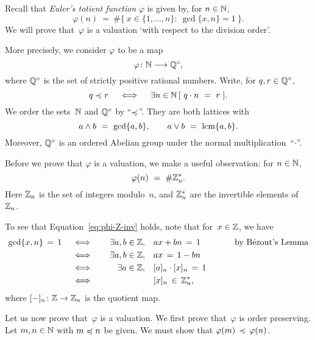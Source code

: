 \documentclass[main.tex]{subfiles}
\begin{document}
\begin{ex}
Recall that \emph{Euler's totient function}
$\varphi$
is given by,
for $n\in \mathbb{N}$,
\begin{equation*}
\varphi(n) \ =\ \#\{ \  x\in \{1,\dotsc,n\}\colon \ \gcd\{x,n\}=1\ \}.
\end{equation*}
We will prove that~$\varphi$
is a valuation `with respect to the division order'.

More precisely,
we consider $\varphi$ to be a map
\begin{equation*}
\varphi\colon \mathbb{N} \longrightarrow  \mathbb{Q}^\circ,
\end{equation*}
where $\mathbb{Q}^\circ$
is the set of strictly positive rational numbers.
Write, for $q,r\in\mathbb{Q}^\circ$,
\begin{equation*}
q\preccurlyeq r \quad\iff\quad \exists n\in\mathbb{N}\, [\ q \cdot n \ =\  r\ ].
\end{equation*}
We order the sets~$\mathbb{N}$ and $\mathbb{Q}^\circ$ by ``$\preccurlyeq$''.
They are both lattices with
\begin{equation*}
a\wedge b \ =\ \gcd\{a,b\},\qquad a \vee b \ =\ \lcm\{a,b\}.
\end{equation*}
Moreover,
$\mathbb{Q}^\circ$
is an ordered Abelian group under the normal multiplication~``$\cdot$''.

Before we prove that $\varphi$ is a valuation,
we make a useful observation: for $n\in\mathbb{N}$,
\begin{equation}
\label{eq:phi-Z-inv}
\varphi(n) \ =\ \# \mathbb{Z}_{n}^*.
\end{equation}
Here $\mathbb{Z}_{n}$ is the set of integers modulo~$n$,
and $\mathbb{Z}_{n}^*$
are the invertible elements of~$\mathbb{Z}_{n}$.

To see that Equation~\eqref{eq:phi-Z-inv} holds,
note that for~$x\in \mathbb{Z}$, we have
\begin{alignat*}{3}
\gcd\{x,n\}\,=\,1
\quad&\iff&\quad
\exists a,b\in\mathbb{Z},& \quad ax + bn \,=\,1  
\qquad&& \text{by B\'ezout's Lemma}\\
\quad&\iff&\quad
\exists a,b\in\mathbb{Z},& \quad ax  \,=\,1 - bn 
\qquad&& \\
\quad&\iff&\quad
\exists a\in\mathbb{Z},& \quad [a]_n\cdot[x]_n \,=\,1 \  
\qquad&& \\
\quad&\iff&\quad
& \quad [x]_n \,\in\, \mathbb{Z}_{n}^*,
\qquad&& 
\end{alignat*}
where $[-]_n\colon \mathbb{Z} \rightarrow \mathbb{Z}_{n}$
is the quotient map.

Let us now prove that~$\varphi$ is a valuation.
We first prove that~$\varphi$ is order preserving.
Let $m,n\in \mathbb{N}$ with $m\preccurlyeq n$ be given.
We must show that $\varphi(m) \,\preccurlyeq\, \varphi(n)$.


\end{ex}
\end{document}
